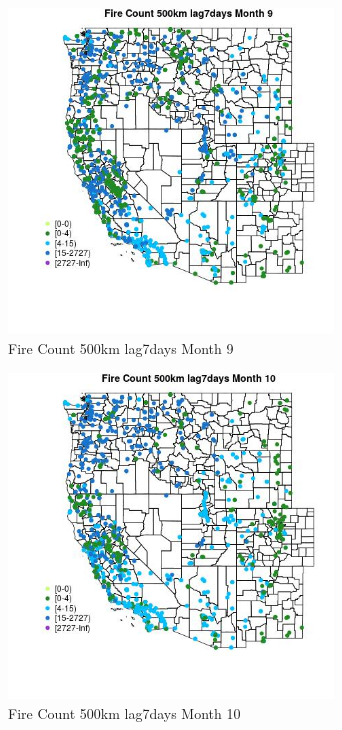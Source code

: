 \begin{figure} 
\centering  
\includegraphics[width=0.77\textwidth]{Code_Outputs/Report_ML_input_PM25_Step4_part_f_de_duplicated_aveswNAs_MapObsMo9Fire_Count_500km_lag7days.jpg} 
\caption{\label{fig:Report_ML_input_PM25_Step4_part_f_de_duplicated_aveswNAsMapObsMo9Fire_Count_500km_lag7days}Fire Count 500km lag7days Month 9} 
\end{figure} 
 

\begin{figure} 
\centering  
\includegraphics[width=0.77\textwidth]{Code_Outputs/Report_ML_input_PM25_Step4_part_f_de_duplicated_aveswNAs_MapObsMo10Fire_Count_500km_lag7days.jpg} 
\caption{\label{fig:Report_ML_input_PM25_Step4_part_f_de_duplicated_aveswNAsMapObsMo10Fire_Count_500km_lag7days}Fire Count 500km lag7days Month 10} 
\end{figure} 
 

